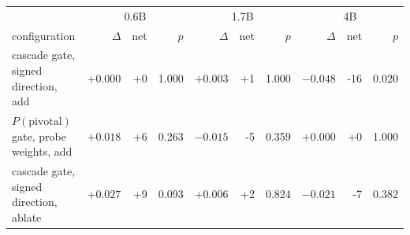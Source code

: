 \begin{tabular}{lrrrrrrrrr}
\toprule
 & \multicolumn{3}{c}{0.6B} & \multicolumn{3}{c}{1.7B} & \multicolumn{3}{c}{4B} \\
configuration & $\Delta$ & net & $p$ & $\Delta$ & net & $p$ & $\Delta$ & net & $p$ \\
\midrule
cascade gate, signed direction, add & $+0.000$ & +0 & 1.000 & $+0.003$ & +1 & 1.000 & $-0.048$ & -16 & 0.020 \\
$P(\text{pivotal})$ gate, probe weights, add & $+0.018$ & +6 & 0.263 & $-0.015$ & -5 & 0.359 & $+0.000$ & +0 & 1.000 \\
cascade gate, signed direction, ablate & $+0.027$ & +9 & 0.093 & $+0.006$ & +2 & 0.824 & $-0.021$ & -7 & 0.382 \\
\bottomrule
\end{tabular}